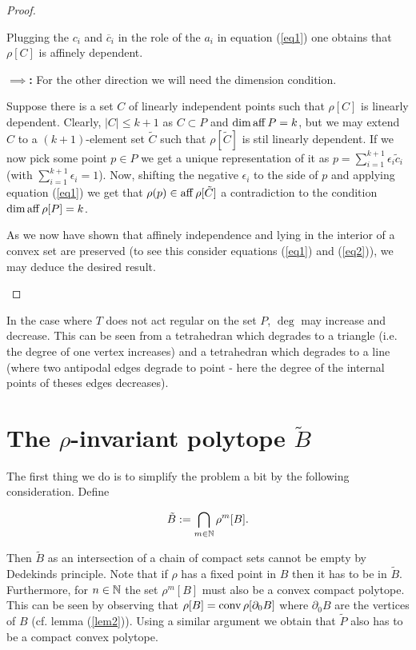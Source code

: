 \documentclass{article}
\begin{document}
\begin{proof}
\begin{enumerate}
Plugging the $c_i$ and $\overline{c}_i$ in the role of the $a_i$ in equation (\ref{eq1}) one obtains that $\rho[C]$ is affinely dependent.

\textbf{$\implies$:} For the other direction we will need the dimension condition. 

Suppose there is a set $C$ of linearly independent points such that $\rho[C]$ is linearly dependent. Clearly, $|C|\leq k+1$ as $C\subset P$ and $\dim\operatorname{aff} P=k$, but we may extend $C$ to a $(k+1)$-element set $\tilde{C}$ such that $\rho[\tilde{C}]$ is stil linearly dependent. If we now pick some point $p\in P$ we get a unique representation of it as $p = \sum_{i=1}^{k+1}{\epsilon_i \tilde{c}_i}$ (with $\sum_{i=1}^{k+1}{\epsilon_i}=1$). Now, shifting the negative $\epsilon_i$ to the side of $p$ and applying equation (\ref{eq1}) we get that $\rho(p)\in\operatorname{aff}\rho[\tilde{C}]$ a contradiction to the condition $\dim\operatorname{aff}\rho[P]=k$.

As we now have shown that affinely independence and lying in the interior of a convex set are preserved (to see this consider equations (\ref{eq1}) and (\ref{eq2})), we may deduce the desired result.
\end{enumerate}
\end{proof}

\begin{remark}
In the case where $T$ does not act regular on the set $P$, $\deg$ may increase and decrease. This can be seen from a tetrahedran which degrades to a triangle (i.e. the degree of one vertex increases) and a tetrahedran which degrades to a line (where two antipodal edges degrade to point - here the degree of the internal points of theses edges decreases).
\end{remark}

\section{The $\rho$-invariant polytope $\tilde{B}$}

The first thing we do is to simplify the problem a bit by the following consideration. Define 

\begin{equation} 
\tilde{B}:=\bigcap_{m\in\mathbb{N}}{\rho^m[B]}\text{.}
\end{equation} 

Then $\tilde{B}$ as an intersection of a chain of compact sets cannot be empty by Dedekinds principle.
Note that if $\rho$ has a fixed point in $B$ then it has to be in $\tilde{B}$. Furthermore, for $n\in\mathbb{N}$ the set $\rho^m[B]$ must also be a convex compact polytope. This can be seen by observing that $\rho[B]=\operatorname{conv}\rho[\partial_0 B]$ where $\partial_0 B$ are the vertices of $B$ (cf. lemma (\ref{lem2})). 
Using a similar argument we obtain that $\tilde{P}$ also has to be a compact convex polytope.
\end{document}
